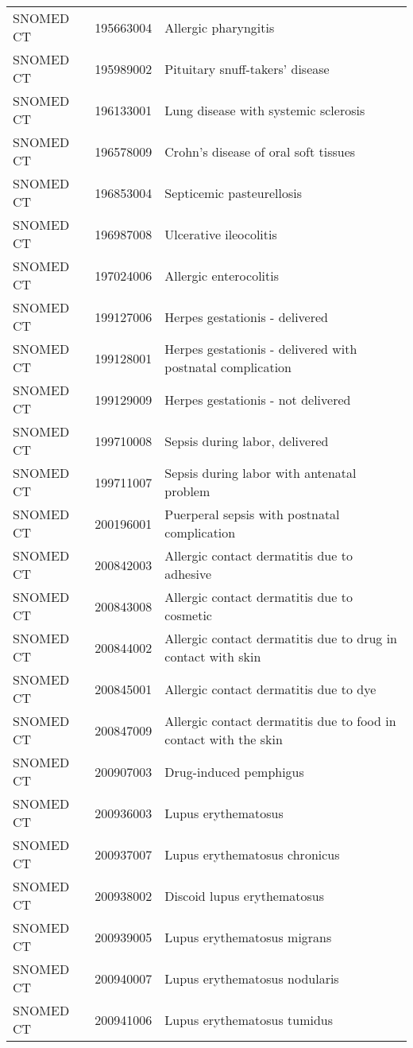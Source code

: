 \begin{longtable}{p{}p{}p{}}
  SNOMED CT & 195663004 & Allergic pharyngitis \\ 
  SNOMED CT & 195989002 & Pituitary snuff-takers' disease \\ 
  SNOMED CT & 196133001 & Lung disease with systemic sclerosis \\ 
  SNOMED CT & 196578009 & Crohn's disease of oral soft tissues \\ 
  SNOMED CT & 196853004 & Septicemic pasteurellosis \\ 
  SNOMED CT & 196987008 & Ulcerative ileocolitis \\ 
  SNOMED CT & 197024006 & Allergic enterocolitis \\ 
  SNOMED CT & 199127006 & Herpes gestationis - delivered \\ 
  SNOMED CT & 199128001 & Herpes gestationis - delivered with postnatal complication \\ 
  SNOMED CT & 199129009 & Herpes gestationis - not delivered \\ 
  SNOMED CT & 199710008 & Sepsis during labor, delivered \\ 
  SNOMED CT & 199711007 & Sepsis during labor with antenatal problem \\ 
  SNOMED CT & 200196001 & Puerperal sepsis with postnatal complication \\ 
  SNOMED CT & 200842003 & Allergic contact dermatitis due to adhesive \\ 
  SNOMED CT & 200843008 & Allergic contact dermatitis due to cosmetic \\ 
  SNOMED CT & 200844002 & Allergic contact dermatitis due to drug in contact with skin \\ 
  SNOMED CT & 200845001 & Allergic contact dermatitis due to dye \\ 
  SNOMED CT & 200847009 & Allergic contact dermatitis due to food in contact with the skin \\ 
  SNOMED CT & 200907003 & Drug-induced pemphigus \\ 
  SNOMED CT & 200936003 & Lupus erythematosus \\ 
  SNOMED CT & 200937007 & Lupus erythematosus chronicus \\ 
  SNOMED CT & 200938002 & Discoid lupus erythematosus \\ 
  SNOMED CT & 200939005 & Lupus erythematosus migrans \\ 
  SNOMED CT & 200940007 & Lupus erythematosus nodularis \\ 
  SNOMED CT & 200941006 & Lupus erythematosus tumidus \\ 

\end{longtable}
